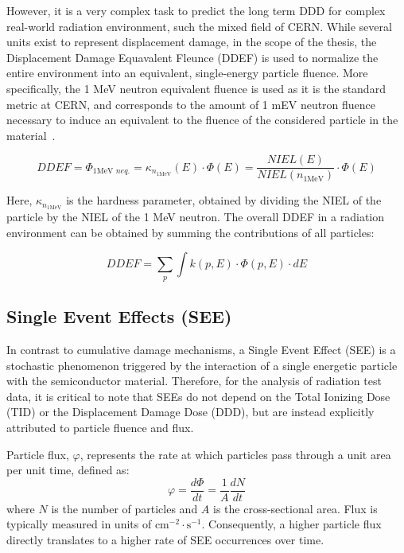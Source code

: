 However, it is a very complex task to predict the long term DDD for complex real-world radiation environment, such the mixed field of CERN. While several units exist to represent displacement damage, in the scope of the thesis, the Displacement Damage Equavalent Fleunce (DDEF) is used to normalize the entire environment into an equivalent, single-energy particle fluence. More specifically, the 1 MeV neutron equivalent fluence is used as it is the standard metric at CERN, and corresponds to the amount of 1 mEV neutron fluence necessary to induce an equivalent to the fluence of the considered particle in the material~\cite{ASTME722_2014}. 

\begin{equation}
DDEF = \Phi_{1\text{MeV } neq.} = \kappa_{n_{1\text{MeV}}}(E) \cdot \Phi(E) = \frac{NIEL(E)}{NIEL(n_{1\text{MeV}})} \cdot \Phi(E)
\end{equation}

Here, $\kappa_{n_{1\text{MeV}}}$ is the hardness parameter, obtained by dividing the NIEL of the particle by the NIEL of the 1 MeV neutron. The overall DDEF in a radiation environment can be obtained by summing the contributions of all particles:

\begin{equation}
DDEF = \sum_{p} \int k(p,E) \cdot \Phi(p,E) \cdot dE
\end{equation}

\subsection{Single Event Effects (SEE)}
\label{subsection:see}

In contrast to cumulative damage mechanisms, a Single Event Effect (SEE) is a stochastic phenomenon triggered by the interaction of a single energetic particle with the semiconductor material. Therefore, for the analysis of radiation test data, it is critical to note that SEEs do not depend on the Total Ionizing Dose (TID) or the Displacement Damage Dose (DDD), but are instead explicitly attributed to particle fluence and flux. 

Particle flux, $\varphi$, represents the rate at which particles pass through a unit area per unit time, defined as:
\begin{equation}
    \varphi = \frac{d\Phi}{dt} = \frac{1}{A} \frac{dN}{dt}
\end{equation}
where $N$ is the number of particles and $A$ is the cross-sectional area. Flux is typically measured in units of $\text{cm}^{-2}\cdot\text{s}^{-1}$. Consequently, a higher particle flux directly translates to a higher rate of SEE occurrences over time.

